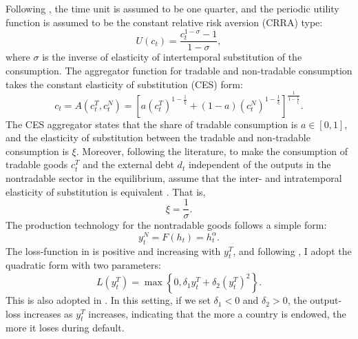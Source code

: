 Following \citet{Na-18}, the time unit is assumed to be one quarter, and the periodic utility function is assumed to be the constant relative risk aversion (CRRA) type:
\begin{equation}
    \label{eq:CRRA-utility}
    U(c_t) = \frac{c_t^{1-\sigma} - 1}{1 - \sigma},
\end{equation}
where $\sigma$ is the inverse of elasticity of intertemporal substitution of the consumption.
The aggregator function for tradable and non-tradable consumption takes the constant elasticity of substitution (CES) form:
\begin{equation}
    \label{eq:aggregator-function}
    c_t = A(c^T_t, c^N_t) =
        \left[ a \left( c^T_t \right)^{1- \frac{1}{\xi}} +
            (1 - a) \left( c^N_t \right)^{1- \frac{1}{\xi}}
        \right]^{\frac{1}{1 - \frac{1}{\xi}}}.
\end{equation}
The CES aggregator states that the share of tradable consumption is $a \in [0,1]$, and the elasticity of substitution between the tradable and non-tradable consumption is $\xi$.
Moreover, following the literature, to make the consumption of tradable goods $c^T_t$ and the external debt $d_t$ independent of the outputs in the nontradable sector in the equilibrium,
assume that the inter- and intratemporal elasticity of substitution is equivalent \citep*[See][Chapter 9.5]{Uribe-Schmitt-Grohe-textbook}.
That is,
\begin{equation}
    \label{eq:xi-sigma}
    \xi = \frac{1}{\sigma}.
\end{equation}
The production technology for the nontradable goods follows a simple form:
\begin{equation}
    \label{eq:production-function}
    y^N_t = F(h_t) = h_t ^\alpha.
\end{equation}
The loss-function in  is positive and increasing with $y^T_t$, and following \citet{Chatterjee-12}, I adopt the quadratic form with two parameters:
\begin{equation}
    L(y^T_t) = \max \left\{
        0, \delta_1 y^T_t + \delta_2 \left( y^T_t \right)^2
     \right\}.
\end{equation}
This is also adopted in \citet{Na-18}. In this setting, if we set $\delta_1 < 0$ and $\delta_2 >0$, the output-loss increases as $y^T_t$ increases, indicating that the more a country is endowed, the more it loses during default.